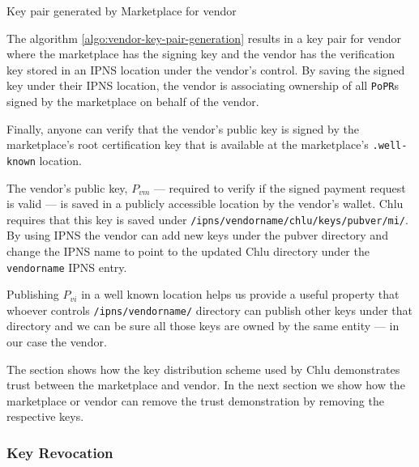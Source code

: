 \documentclass[a4paper]{article}
\begin{document}
\begin{algorithm}
  \caption{Key pair generated by Marketplace for vendor}\label{algo:vendor-key-pair-generation}
  \begin{algorithmic}
  \end{algorithmic}    
\end{algorithm}

The algorithm \ref{algo:vendor-key-pair-generation} results in a key
pair for vendor where the marketplace has the signing key and the
vendor has the verification key stored in an IPNS location under the
vendor's control. By saving the signed key under their IPNS location,
the vendor is associating ownership of all \texttt{PoPR}s signed by
the marketplace on behalf of the vendor.

Finally, anyone can verify that the vendor's public key is signed by
the marketplace's root certification key that is available at the
marketplace's \texttt{.well-known} location.

The vendor's public key, $P_{vm}$ --- required to verify if the signed
payment request is valid --- is saved in a publicly accessible
location by the vendor's wallet. Chlu requires that this key is saved
under \texttt{/ipns/vendorname/chlu/keys/pubver/mi/}. By using IPNS
the vendor can add new keys under the pubver directory and change the
IPNS name to point to the updated Chlu directory under the
\texttt{vendorname} IPNS entry.

Publishing $P_{vi}$ in a well known location helps us provide a useful
property that whoever controls \texttt{/ipns/vendorname/} directory
can publish other keys under that directory and we can be sure all
those keys are owned by the same entity --- in our case the vendor.

The section shows how the key distribution scheme used by Chlu
demonstrates trust between the marketplace and vendor. In the next
section we show how the marketplace or vendor can remove the trust
demonstration by removing the respective keys.

\subsubsection{Key Revocation}\label{sec:key-revocation}
\end{document}
